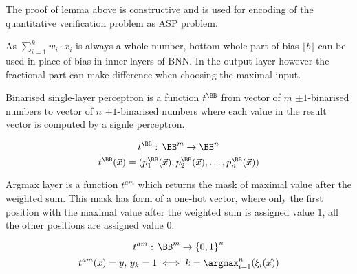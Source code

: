 \begin{remark}
The proof of lemma above is constructive and is used for encoding
of the quantitative verification problem as ASP problem.
\end{remark}

\begin{remark}
As $\sum_{i=1}^k w_i\cdot x_i$ is always a whole number, bottom whole part of bias
$\lfloor b \rfloor$ can be used in place of bias in inner layers of BNN.\@
In the output layer however the fractional part can make difference when choosing the
maximal input.
\end{remark}

\begin{definition}
Binarised single-layer perceptron is a function $t^\BB$ from vector of $m$ $\pm 1$-binarised numbers
to vector of $n$ $\pm 1$-binarised numbers where each value in the result vector is computed
by a signle perceptron.

\begin{equation*}
    t^\BB: \, \BB^{m} \to \BB^{n}
\end{equation*}
\begin{equation*}
    t^\BB(\vec x) = (p^\BB_{1}(\vec x), p^\BB_{2}(\vec x), \ldots, p^\BB_{n}(\vec x))
\end{equation*}
\end{definition}

\begin{definition}
Argmax layer is a function $t^{am}$ which returns the mask of maximal value after
the weighted sum. This mask has form of a one-hot vector, where only the first
position with the maximal value after the weighted sum is assigned value $1$,
all the other positions are assigned value $0$.

\begin{equation*}
	t^{am}: \, \BB^{m} \to {\{0,1\}}^{n}
\end{equation*}
\begin{equation*}
	t^{am}(\vec x) = y,\, y_k = 1 \iff k = \argmax_{i=1}^n(\xi_i(\vec x))
\end{equation*}
\end{definition}

